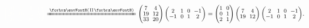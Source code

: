 $\Blind{{\small\begin{pmatrix} 10 &\hspace{-4pt} 7 &\hspace{-4pt} 4 &\hspace{-4pt} 1 \\[-2pt] 26 &\hspace{-4pt} 19 &\hspace{-4pt} 12 &\hspace{-4pt} 5\\[-2pt] 46 &\hspace{-4pt} 33 &\hspace{-4pt} 20 &\hspace{-4pt} 7\end{pmatrix}}}\xlongequal{\SmallPar{\text{II}}}{\small\begin{pmatrix} 7 &\hspace{-4pt} 4\\[-2pt] 19 &\hspace{-4pt} 12\\[-2pt] 33 &\hspace{-4pt} 20\end{pmatrix}\begin{pmatrix} 2 &\hspace{-4pt} 1 &\hspace{-4pt} 0 &\hspace{-4pt} -1\\[-2pt] -1 &\hspace{-4pt} 0 &\hspace{-4pt} 1 &\hspace{-4pt} 2\end{pmatrix}}={\small\begin{pmatrix} 1 &\hspace{-4pt} 0\\[-2pt] 0 &\hspace{-4pt} 1\\[-2pt] 2 &\hspace{-4pt} 1\end{pmatrix}\begin{pmatrix} 7 &\hspace{-4pt} 4\\[-2pt] 19 &\hspace{-4pt} 12\end{pmatrix}\begin{pmatrix} 2 &\hspace{-4pt} 1 &\hspace{-4pt} 0 &\hspace{-4pt} -1\\[-2pt] -1 &\hspace{-4pt} 0 &\hspace{-4pt} 1 &\hspace{-4pt} 2\end{pmatrix}}.$\vspace{8pt}
